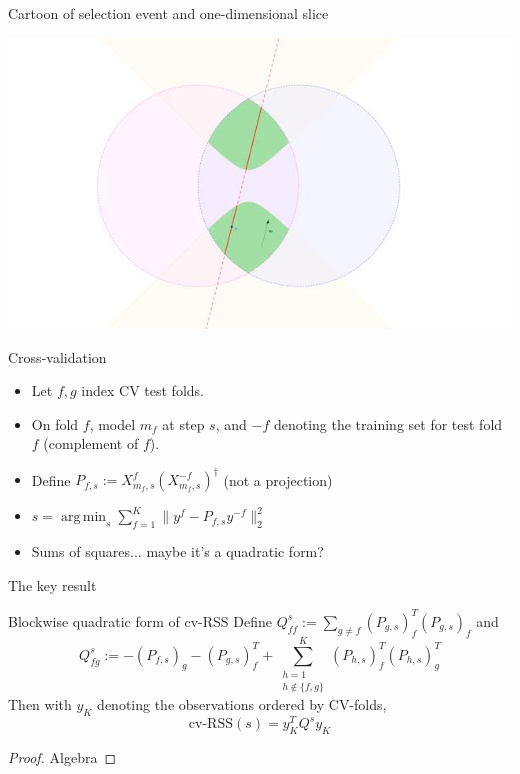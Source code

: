 \documentclass{beamer}
\DeclareMathOperator*{\argmin}{arg\,min}
\begin{document}
\begin{frame}{Cartoon of selection event and one-dimensional slice}

  \includegraphics[width=\textwidth]{leonard.jpeg}

\end{frame}

\begin{frame}{Cross-validation}
  
  \begin{itemize}

  \item Let $f, g$ index CV test folds. 

  \item On fold $f$, model $m_f$ at step $s$, and $-f$ denoting the
    training set for test fold $f$ (complement of $f$). 

  \item Define $P_{f,s} := X^f_{m_f,s}(X^{-f}_{m_f,s})^\dagger$ (not a projection)

  \item $s = \argmin_s \sum_{f=1}^K \| y^{f} - P_{f,s} y^{-f} \|_2^2$ 

  \item Sums of squares... maybe it's a quadratic form?

  \end{itemize}

\end{frame}

\begin{frame}{The key result}
  
  \begin{block}{Blockwise quadratic form of cv-RSS}
    Define $Q^s_{ff} := \sum_{g\neq f}(P_{g,s})_f^T(P_{g,s})_f$ and
    \[
      Q^s_{fg} := -(P_{f,s})_g - (P_{g,s})^T_f + \sum_{\substack{h=1\\h \notin \{f, g \}}}^K (P_{h,s})^T_f (P_{h,s})^T_g
    \]
     Then with $y_K$ denoting the observations ordered by CV-folds, 
    \[
    \text{cv-RSS}(s) = y_K^TQ^sy_K
    \]
  \end{block}
  
  \begin{proof}
    Algebra
  \end{proof}

\end{frame}
\end{document}
